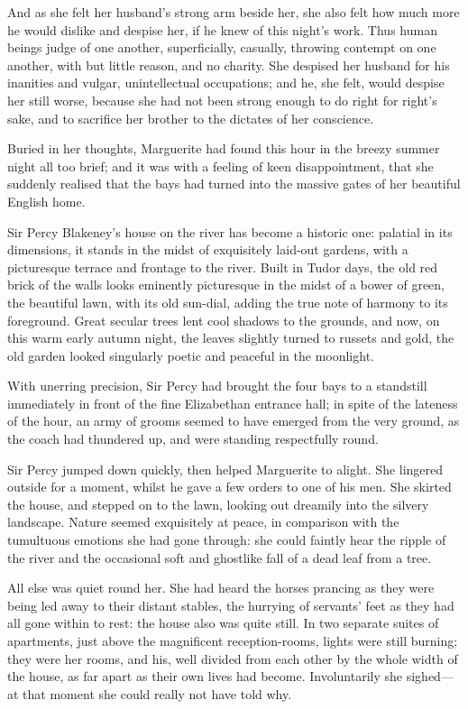 \documentclass[paper=a5,BCOR=7mm,twoside,DIV=calc,12pt,usegeometry,chapterprefix,endperiod,headings=big]{scrbook}
\begin{document}
And as she felt her husband's strong arm beside her, she also felt how much more he would dislike and despise her, if he knew of this night's work. Thus human beings judge of one another, superficially, casually, throwing contempt on one another, with but little reason, and no charity. She despised her husband for his inanities and vulgar, unintellectual occupations; and he, she felt, would despise her still worse, because she had not been strong enough to do right for right's sake, and to sacrifice her brother to the dictates of her conscience.

Buried in her thoughts, Marguerite had found this hour in the breezy summer night all too brief; and it was with a feeling of keen disappointment, that she suddenly realised that the bays had turned into the massive gates of her beautiful English home.

Sir Percy Blakeney's house on the river has become a historic one: palatial in its dimensions, it stands in the midst of exquisitely laid-out gardens, with a picturesque terrace and frontage to the river. Built in Tudor days, the old red brick of the walls looks eminently picturesque in the midst of a bower of green, the beautiful lawn, with its old sun-dial, adding the true note of harmony to its foreground. Great secular trees lent cool shadows to the grounds, and now, on this warm early autumn night, the leaves slightly turned to russets and gold, the old garden looked singularly poetic and peaceful in the moonlight.

With unerring precision, Sir Percy had brought the four bays to a standstill immediately in front of the fine Elizabethan entrance hall; in spite of the lateness of the hour, an army of grooms seemed to have emerged from the very ground, as the coach had thundered up, and were standing respectfully round.

Sir Percy jumped down quickly, then helped Marguerite to alight. She lingered outside for a moment, whilst he gave a few orders to one of his men. She skirted the house, and stepped on to the lawn, looking out dreamily into the silvery landscape. Nature seemed exquisitely at peace, in comparison with the tumultuous emotions she had gone through: she could faintly hear the ripple of the river and the occasional soft and ghostlike fall of a dead leaf from a tree.

All else was quiet round her. She had heard the horses prancing as they were being led away to their distant stables, the hurrying of servants’ feet as they had all gone within to rest: the house also was quite still. In two separate suites of apartments, just above the magnificent reception-rooms, lights were still burning; they were her rooms, and his, well divided from each other by the whole width of the house, as far apart as their own lives had become. Involuntarily she sighed---at that moment she could really not have told why.
\end{document}
